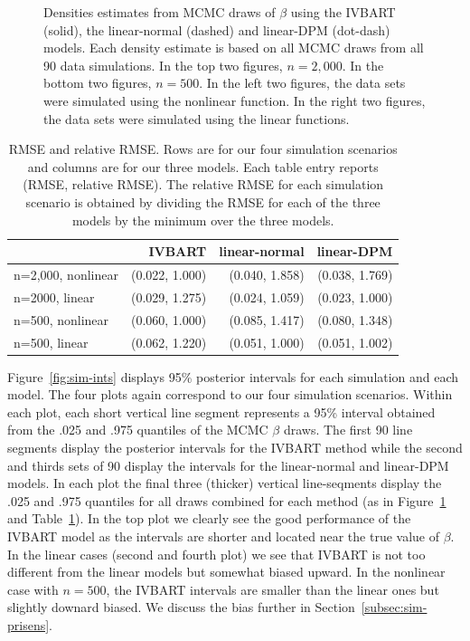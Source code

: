 \begin{figure}
\caption{%
Densities estimates from MCMC draws of $\beta$ using the IVBART (solid), the linear-normal (dashed) and linear-DPM (dot-dash) models.
Each density estimate is based on all MCMC draws from all 90 data simulations.
In the top two figures, $n=2,000$.
In the bottom two figures, $n=500$.
In the left two figures, the data sets were simulated using the nonlinear function.
In the right two figures, the data sets were simulated using the linear functions.
\label{fig:alldraws}}
\end{figure}

\begin{table}[tbp]  \centering
\begin{tabular}{l|rrr}
 & IVBART & linear-normal & linear-DPM \\
\hline
n=2,000, nonlinear & (0.022, 1.000) & (0.040, 1.858) & (0.038, 1.769) \\
n=2000, linear & (0.029, 1.275) & (0.024, 1.059) & (0.023, 1.000) \\
n=500, nonlinear & (0.060, 1.000) & (0.085, 1.417) & (0.080, 1.348) \\
n=500, linear & (0.062, 1.220) & (0.051, 1.000) & (0.051, 1.002)
\end{tabular}
\caption{%
RMSE and relative RMSE. 
Rows are for our four simulation scenarios and columns are for our three models.
Each table entry reports (RMSE, relative RMSE).
The relative RMSE for each simulation scenario is obtained by dividing the RMSE
for each of the three models by the minimum over the three models. 
\label{tab:rmse}
}
\end{table}

Figure~\ref{fig:sim-ints} displays 95\% posterior intervals for each simulation and each model.
The four plots again correspond to our four simulation scenarios.
Within each plot, each short vertical line segment represents a 95\% interval obtained from the 
.025 and .975 quantiles of the MCMC $\beta$ draws.
The first 90 line segments display the posterior intervals for the IVBART method while the 
second and thirds sets of 90 display the intervals for the linear-normal and linear-DPM models.
In each plot the final three (thicker) vertical line-seqments display the .025 and .975 quantiles for all draws
combined for each method (as in Figure~\ref{fig:alldraws} and Table~\ref{tab:rmse}).
In the top plot we clearly see the good performance of the IVBART model as the intervals are shorter
and located near the true value of $\beta$.
In the linear cases (second and fourth plot) we see that IVBART is not too different from the linear
models but somewhat biased upward.
In the nonlinear case with $n = 500$, the IVBART intervals are smaller than the linear ones but slightly
downard biased.
We discuss the bias further in Section~\ref{subsec:sim-prisens}.

